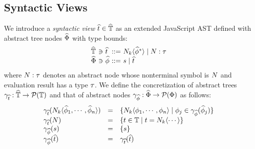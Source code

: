\subsection{Syntactic Views}\label{sec:view}

We introduce a \textit{syntactic view} $\widehat{t} \in \widehat{\mathbb{T}}$ as an extended
JavaScript AST defined with abstract tree nodes $\widehat{\Phi}$ with type bounds:
\[
  \begin{array}{l@{~}c@{~}l@{~}c@{~}l}
    \atreeset &\ni& \atree &::=& \nt_k \langle \anode^* \rangle \mid \nt: \ty \\
    \anodeset &\ni& \anode &::=& \str \mid \atree\\
  \end{array}
\]
where $N: \tau$ denotes an abstract node whose nonterminal symbol is $N$ and
evaluation result has a type $\tau$.  We define the concretization of abstract
trees $\gamma_{\widehat{t}}: \widehat{\mathbb{T}} \rightarrow \mathcal{P}(\mathbb{T})$ and that of
abstract nodes $\gamma_{\widehat{\phi}}: \widehat{\Phi} \rightarrow \mathcal{P}(\Phi)$ as
follows:
\[
  \begin{array}{lcl}
    \gamma_{\widehat{t}}(N_k \langle \widehat{\phi}_1, \cdots, \widehat{\phi}_n \rangle) &=&
    \{ N_k \langle \phi_1, \cdots, \phi_n \rangle \mid \phi_j \in
    \gamma_{\widehat{\phi}}(\widehat{\phi}_j) \}\\

    \gamma_{\widehat{t}}(N) &=&
    \{ t \in \mathbb{T} \mid t = N_k \langle \cdots \rangle \}\\

    \gamma_{\widehat{\phi}}(s) &=& \{ s \}\\

    \gamma_{\widehat{\phi}}(\widehat{t}) &=& \gamma_{\widehat{t}}(\widehat{t})\\
  \end{array}
\]

